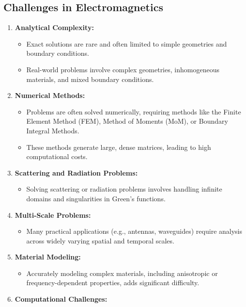 \documentclass[12pt]{article}
\begin{document}
\subsection{Challenges in Electromagnetics}
\begin{enumerate}
    \item \textbf{Analytical Complexity:}
          \begin{itemize}
              \item Exact solutions are rare and often limited to simple geometries and boundary conditions\cite{AEM}.
              \item Real-world problems involve complex geometries, inhomogeneous materials, and mixed boundary conditions.
          \end{itemize}
    \item \textbf{Numerical Methods:}
          \begin{itemize}
              \item Problems are often solved numerically, requiring methods like the Finite Element Method (FEM), Method of Moments (MoM), or Boundary Integral Methods.
              \item These methods generate large, dense matrices, leading to high computational costs.
          \end{itemize}
    \item \textbf{Scattering and Radiation Problems:}
          \begin{itemize}
              \item Solving scattering or radiation problems involves handling infinite domains and singularities in Green's functions.
          \end{itemize}
    \item \textbf{Multi-Scale Problems:}
          \begin{itemize}
              \item Many practical applications (e.g., antennas, waveguides) require analysis across widely varying spatial and temporal scales.
          \end{itemize}
    \item \textbf{Material Modeling:}
          \begin{itemize}
              \item Accurately modeling complex materials, including anisotropic or frequency-dependent properties, adds significant difficulty.
          \end{itemize}
    \item \textbf{Computational Challenges:}

\end{enumerate}
\end{document}
